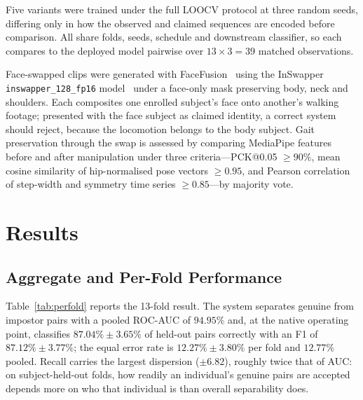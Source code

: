 \documentclass[conference]{IEEEtran}
\begin{document}
Five variants were trained under the full LOOCV protocol at three random seeds,
differing only in how the observed and claimed sequences are encoded before
comparison. All share folds, seeds, schedule and downstream classifier, so each
compares to the deployed model pairwise over $13 \times 3 = 39$ matched
observations.

Face-swapped clips were generated with FaceFusion~\cite{facefusion} using the
InSwapper \texttt{inswapper\_128\_fp16} model~\cite{insightface} under a
face-only mask preserving body, neck and shoulders. Each composites one
enrolled subject's face onto another's walking footage; presented with the face
subject as claimed identity, a correct system should reject, because the
locomotion belongs to the body subject. Gait preservation through the swap is
assessed by comparing MediaPipe features before and after manipulation under
three criteria---PCK@0.05 $\ge 90\%$, mean cosine similarity of hip-normalised
pose vectors $\ge 0.95$, and Pearson correlation of step-width and symmetry
time series $\ge 0.85$---by majority vote.

\section{Results}
\label{sec:results}

\subsection{Aggregate and Per-Fold Performance}
\label{sec:perfold}

Table~\ref{tab:perfold} reports the 13-fold result. The system separates
genuine from impostor pairs with a pooled ROC-AUC of $94.95\%$ and, at the
native operating point, classifies $87.04\% \pm 3.65\%$ of held-out pairs
correctly with an F1 of $87.12\% \pm 3.77\%$; the equal error rate is
$12.27\% \pm 3.80\%$ per fold and $12.77\%$ pooled. Recall carries the largest
dispersion ($\pm 6.82$), roughly twice that of AUC: on subject-held-out folds,
how readily an individual's genuine pairs are accepted depends more on who that
individual is than overall separability does.
\end{document}
